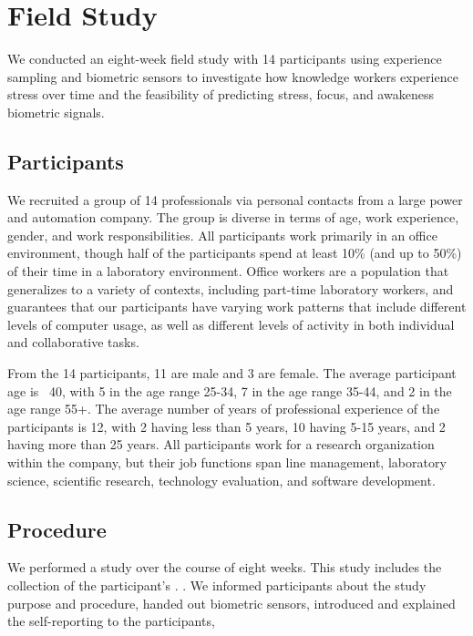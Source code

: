 \section{Field Study}
We conducted an eight-week field study with 14 participants using experience sampling and biometric sensors to investigate how knowledge workers experience stress  over time and the feasibility of predicting stress, focus, and awakeness  biometric signals. 


\subsection{Participants}
We recruited a group of 14 professionals via personal contacts from a large power and automation company. The group is diverse in terms of age, work experience, gender, and work responsibilities. All participants work primarily in an office environment, though half of the participants spend at least 10\% (and up to 50\%) of their time in a laboratory environment. Office workers are a population that generalizes to a variety of contexts, including part-time laboratory workers, and guarantees that our participants have varying work patterns that include different levels of computer usage, as well as different levels of activity in both individual and collaborative tasks.

From the 14 participants, 11 are male and 3 are female. The average participant age is ~40, with 5 in the age range 25-34, 7 in the age range 35-44, and 2 in the age range 55+. The average number of years of professional experience of the participants is 12, with 2 having less than 5 years, 10 having 5-15 years, and 2 having more than 25 years. All participants work for a research organization within the company, but their job functions span line management, laboratory science, scientific research, technology evaluation, and software development.


\subsection{Procedure}
We performed a study over the course of eight weeks. This study includes the collection of the participant's . . We informed participants about the study purpose and procedure, handed out biometric sensors, introduced and explained the self-reporting to the participants, 



